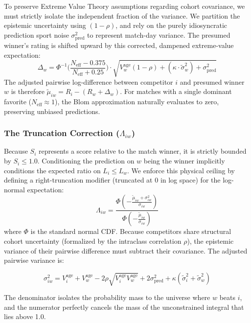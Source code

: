 \documentclass[12pt]{article}
\begin{document}
	To preserve Extreme Value Theory assumptions regarding cohort covariance, we must strictly isolate the independent fraction of the variance. We partition the epistemic uncertainty using $(1 - \rho)$, and rely on the purely idiosyncratic prediction sport noise $\sigma_{\mathrm{pred}}^2$ to represent match-day variance. The presumed winner's rating is shifted upward by this corrected, dampened extreme-value expectation:
	\begin{equation}
		\Delta_w = \Phi^{-1}\Big(\frac{N_\mathrm{eff} - 0.375}{N_\mathrm{eff} + 0.25}\Big) \cdot \sqrt{V_w^{\mathrm{age}}(1 - \rho) + (\kappa \cdot \tilde{\sigma}_w^2) + \sigma_{\mathrm{pred}}^2}
	\end{equation}
	The adjusted pairwise log-difference between competitor $i$ and presumed winner $w$ is therefore $\tilde{\mu}_{iw} = R_i - (R_w + \Delta_w)$. For matches with a single dominant favorite ($N_{\mathrm{eff}} \approx 1$), the Blom approximation naturally evaluates to zero, preserving unbiased predictions.

	\subsubsection*{The Truncation Correction ($\Lambda_{iw}$)}
	Because $S_i$ represents a score relative to the match winner, it is strictly bounded by $S_i \le 1.0$. Conditioning the prediction on $w$ being the winner implicitly conditions the expected ratio on $L_i \le L_w$. We enforce this physical ceiling by defining a right-truncation modifier (truncated at $0$ in log space) for the log-normal expectation:
	\begin{equation}
		\Lambda_{iw} = \frac{\Phi\!\left(-\frac{\tilde{\mu}_{iw} + \sigma_{iw}^2}{\sigma_{iw}}\right)}{\Phi\!\left(-\frac{\tilde{\mu}_{iw}}{\sigma_{iw}}\right)}
	\end{equation}
	where $\Phi$ is the standard normal CDF. Because competitors share structural cohort uncertainty (formalized by the intraclass correlation $\rho$), the epistemic variance of their pairwise difference must subtract their covariance. The adjusted pairwise variance is:

	\begin{equation}
		\sigma_{iw}^2 = V_i^{\mathrm{age}} + V_w^{\mathrm{age}} - 2\rho\sqrt{V_i^{\mathrm{age}} V_w^{\mathrm{age}}} + 2\sigma_{\mathrm{pred}}^2 + \kappa(\tilde{\sigma}_i^2 + \tilde{\sigma}_w^2)
	\end{equation}

	The denominator isolates the probability mass to the universe where $w$ beats $i$, and the numerator perfectly cancels the mass of the unconstrained integral that lies above 1.0.
\end{document}
